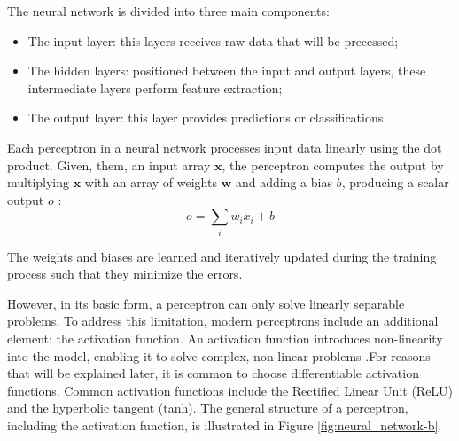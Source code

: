 The neural network is divided into three main components: 
\begin{itemize}
    \item The input layer: this layers receives raw data that will be precessed;
    \item The hidden layers: positioned between the input and output layers, these intermediate layers perform feature extraction;
    \item The output layer: this layer provides predictions or classifications
\end{itemize}

Each perceptron in a neural network processes input data linearly using the dot product. Given, them, an input array $\mathbf{x}$, the perceptron computes the output by multiplying $\mathbf{x}$ with an array of weights $\mathbf{w}$ and adding a bias $b$, producing a scalar output $o$ \cite{Gurney_1997}:
\begin{equation}
    o = \sum_{i}w_i x_i + b
\end{equation}

The weights and biases are learned and iteratively updated during the training process such that they minimize the errors.

However, in its basic form, a perceptron can only solve linearly separable problems. To address this limitation, modern perceptrons include an additional element: the activation function. An activation function introduces non-linearity into the model, enabling it to solve complex, non-linear problems \cite{Roth_2016}.For reasons that will be explained later, it is common to choose differentiable activation functions. Common activation functions include the Rectified Linear Unit (ReLU) and the hyperbolic tangent (tanh). The general structure of a perceptron, including the activation function, is illustrated in Figure \ref{fig:neural_network-b}.



